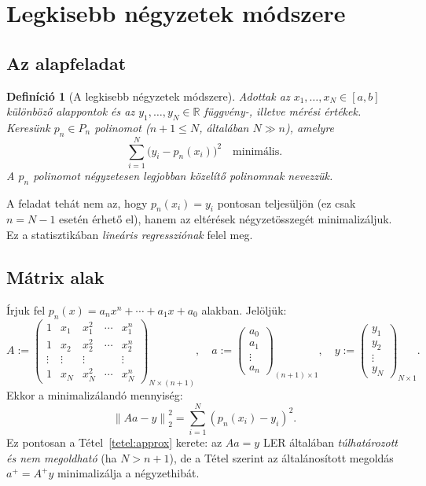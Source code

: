 \documentclass[a4paper,12pt]{article}
\theoremstyle{mydef}
\newtheorem{definicio}[tetel]{Definíció}
\newcommand{\R}{\mathbb{R}}
\newcommand{\norm}[1]{\left\|#1\right\|}
\begin{document}
\section{Legkisebb négyzetek módszere}
\label{sec:lnm}

\subsection*{Az alapfeladat}

\begin{mdframed}[backgroundcolor=defbg,linewidth=0pt,innertopmargin=8pt,innerbottommargin=8pt]
\begin{definicio}[A legkisebb négyzetek módszere]
Adottak az $x_1, \ldots, x_N \in [a,b]$ különböző alappontok és az
$y_1, \ldots, y_N \in \R$ függvény-, illetve mérési értékek.
Keresünk $p_n \in P_n$ polinomot ($n+1 \le N$, általában $N \gg n$), amelyre
\[
  \sum_{i=1}^N \bigl(y_i - p_n(x_i)\bigr)^2 \quad \text{minimális.}
\]
A $p_n$ polinomot \emph{négyzetesen legjobban közelítő polinomnak} nevezzük.
\end{definicio}
\end{mdframed}

A feladat tehát nem az, hogy $p_n(x_i) = y_i$ pontosan teljesüljön (ez csak $n = N-1$ esetén
érhető el), hanem az eltérések négyzetösszegét minimalizáljuk. Ez a statisztikában
\emph{lineáris regressziónak} felel meg.

\subsection*{Mátrix alak}

Írjuk fel $p_n(x) = a_n x^n + \cdots + a_1 x + a_0$ alakban. Jelöljük:
\[
  A :=
  \begin{pmatrix}
    1 & x_1 & x_1^2 & \cdots & x_1^n \\
    1 & x_2 & x_2^2 & \cdots & x_2^n \\
    \vdots & \vdots & \vdots & & \vdots \\
    1 & x_N & x_N^2 & \cdots & x_N^n
  \end{pmatrix}_{N\times(n+1)},
  \quad
  a :=
  \begin{pmatrix} a_0 \\ a_1 \\ \vdots \\ a_n \end{pmatrix}_{(n+1)\times 1},
  \quad
  y :=
  \begin{pmatrix} y_1 \\ y_2 \\ \vdots \\ y_N \end{pmatrix}_{N\times 1}.
\]
Ekkor a minimalizálandó mennyiség:
\[
  \norm{Aa - y}_2^2 = \sum_{i=1}^N (p_n(x_i) - y_i)^2.
\]
Ez pontosan a Tétel~\ref{tetel:approx} kerete: az $Aa = y$ LER általában
\emph{túlhatározott és nem megoldható} (ha $N > n+1$), de a Tétel szerint az
általánosított megoldás $a^+ = A^+ y$ minimalizálja a négyzethibát.
\end{document}
